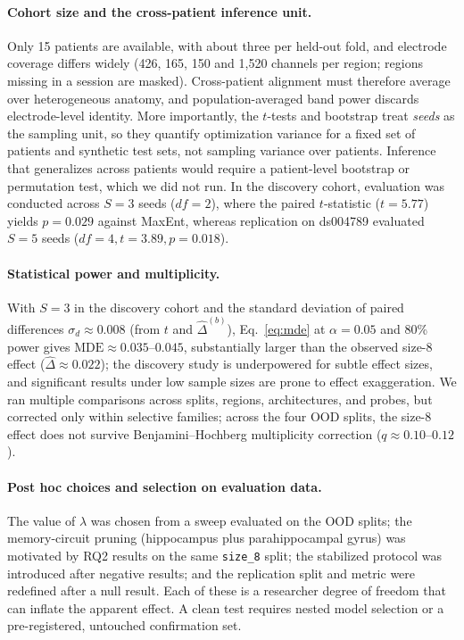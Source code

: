 \documentclass[conference]{IEEEtran}
\begin{document}
\paragraph{Cohort size and the cross-patient inference unit.}
Only 15 patients are available, with about three per held-out fold, and electrode coverage differs widely (426, 165, 150 and 1{,}520 channels per region; regions missing in a session are masked). Cross-patient alignment must therefore average over heterogeneous anatomy, and population-averaged band power discards electrode-level identity. More importantly, the $t$-tests and bootstrap treat \emph{seeds} as the sampling unit, so they quantify optimization variance for a fixed set of patients and synthetic test sets, not sampling variance over patients. Inference that generalizes across patients would require a patient-level bootstrap or permutation test, which we did not run. In the discovery cohort, evaluation was conducted across $S=3$ seeds ($df=2$), where the paired $t$-statistic ($t=5.77$) yields $p=0.029$ against MaxEnt, whereas replication on ds004789 evaluated $S=5$ seeds ($df=4, t=3.89, p=0.018$).

\paragraph{Statistical power and multiplicity.}
With $S=3$ in the discovery cohort and the standard deviation of paired differences $\sigma_d\approx0.008$ (from $t$ and $\hat\Delta^{(b)}$), Eq.~\eqref{eq:mde} at $\alpha=0.05$ and 80\% power gives $\mathrm{MDE}\approx0.035$--$0.045$, substantially larger than the observed size-8 effect ($\hat\Delta\approx0.022$); the discovery study is underpowered for subtle effect sizes, and significant results under low sample sizes are prone to effect exaggeration. We ran multiple comparisons across splits, regions, architectures, and probes, but corrected only within selective families; across the four OOD splits, the size-8 effect does not survive Benjamini--Hochberg multiplicity correction ($q\approx0.10$--$0.12$).

\paragraph{Post hoc choices and selection on evaluation data.}
The value of $\lambda$ was chosen from a sweep evaluated on the OOD splits; the memory-circuit pruning (hippocampus plus parahippocampal gyrus) was motivated by RQ2 results on the same \texttt{size\_8} split; the stabilized protocol was introduced after negative results; and the replication split and metric were redefined after a null result. Each of these is a researcher degree of freedom that can inflate the apparent effect. A clean test requires nested model selection or a pre-registered, untouched confirmation set.
\end{document}
